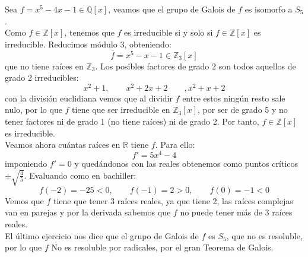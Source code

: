 \begin{ejercicio}
    Sea $f=x^5-4x-1\in \mathbb{Q}[x]$, veamos que el grupo de Galois de $f$ es isomorfo a $S_5$.\\

    \noindent
    Como $f\in \mathbb{Z}[x]$, tenemos que $f$ es irreducible si y solo si $f\in \mathbb{Z}[x]$ es irreducible. Reducimos módulo 3, obteniendo:
    \begin{equation*}
        \overline{f}  = x^5-x-1\in \mathbb{Z}_3[x]
    \end{equation*}
    que no tiene raíces en $\mathbb{Z}_3$. Los posibles factores de grado 2 son todos aquellos de grado 2 irreducibles:
    \begin{equation*}
        x^2+1, \qquad x^2+2x+2 \qquad, x^2+x+2
    \end{equation*}
    con la división euclidiana vemos que al dividir $f$ entre estos ningún resto sale nulo, por lo que $f$ tiene que ser irreducible en $\mathbb{Z}_3[x]$, por ser de grado 5 y no tener factores ni de grado 1 (no tiene raíces) ni de grado 2. Por tanto, $f\in \mathbb{Z}[x]$  es irreducible.\\

    \noindent
    Veamos ahora cuántas raíces en $\mathbb{R}$ tiene $f$. Para ello:
    \begin{equation*}
        f' = 5x^4-4
    \end{equation*}
    imponiendo $f' = 0$ y quedándonos con las reales obtenemos como puntos críticos $\pm \sqrt{\frac{4}{5}}$. 
    Evaluando como en bachiller:
    \begin{equation*}
        f(-2) = -25<0, \qquad f(-1) = 2>0, \qquad f(0) = -1<0
    \end{equation*}
    Vemos que $f$ tiene que tener 3 raíces reales, ya que tiene 2, las raíces complejas van en parejas y por la derivada sabemos que $f$ no puede tener más de 3 raíces reales.\\

    \noindent
    El último ejercicio nos dice que el grupo de Galois de $f$ es $S_5$, que no es resoluble, por lo que $f$ No es resoluble por radicales, por el gran Teorema de Galois.
\end{ejercicio}


